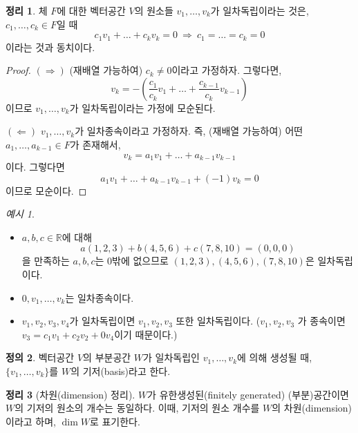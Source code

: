 \documentclass[unfonts,oneside,a4paper]{oblivoir}
\theoremstyle{definition}
\newtheorem{definition}{정의}[section]
\theoremstyle{theorem}
\newtheorem{theorem}[definition]{정리}
\theoremstyle{theorem}
\theoremstyle{remark}
\theoremstyle{remark}
\theoremstyle{remark}
\newtheorem*{example}{예시}
\theoremstyle{remark}
\renewcommand{\vec}[1]{\bm{\mathit{#1}}}
\newcommand{\vecz}{\bm{\mathrm{0}}}
\begin{document}
\begin{theorem}
    체 $F$에 대한 벡터공간 $V$의 원소들 $\vec v_1, \dots, \vec v_k$가 일차독립이라는 것은, $c_1, \dots, c_k \in F$일 때
    \[
        c_1 \vec v_1 + \dots + c_k \vec v_k = \vecz\ \Rightarrow\ c_1 = \dots = c_k = 0
    \]
    이라는 것과 동치이다.
\end{theorem}

\begin{proof}
    $(\Rightarrow)$ (재배열 가능하여) $c_k \neq 0$이라고 가정하자.
    그렇다면,
    \[
        \vec v_k = - \left(\frac{c_1}{c_k} \vec v_1 + \dots + \frac{c_{k - 1}}{c_k} \vec v_{k - 1}\right)
    \]
    이므로 $\vec v_1, \dots, \vec v_k$가 일차독립이라는 가정에 모순된다.

    $(\Leftarrow)$ $\vec v_1, \dots, \vec v_k$가 일차종속이라고 가정하자.
    즉, (재배열 가능하여) 어떤 $a_1, \dots, a_{k - 1} \in F$가 존재해서,
    \[
        \vec v_k = a_1 \vec v_1 + \dots + a_{k - 1} \vec v_{k - 1}
    \]
    이다.
    그렇다면
    \[
        a_1 \vec v_1 + \dots + a_{k - 1} \vec v_{k - 1} + (-1) \vec v_k = \vecz
    \]
    이므로 모순이다.
\end{proof}

\begin{example}
    \leavevmode
    \begin{itemize}
        \item $a, b, c \in \mathbb R$에 대해
            \[
                a(1, 2, 3) + b(4, 5, 6) + c(7, 8, 10) = (0, 0, 0)
            \]
            을 만족하는 $a, b, c$는 0밖에 없으므로 $(1, 2, 3), (4, 5, 6), (7, 8, 10)$은 일차독립이다.
        \item $\vecz, \vec v_1, \dots, \vec v_k$는 일차종속이다.
        \item $\vec v_1, \vec v_2, \vec v_3, \vec v_4$가 일차독립이면 $\vec v_1, \vec v_2, \vec v_3$ 또한 일차독립이다.
            ($\vec v_1, \vec v_2, \vec v_3$ 가 종속이면 $\vec v_3 = c_1 \vec v_1 + c_2 \vec v_2 + 0 \vec v_4$이기 때문이다.)
    \end{itemize}
\end{example}

\begin{definition}
    벡터공간 $V$의 부분공간 $W$가 일차독립인 $\vec v_1, \dots, \vec v_k$에 의해 생성될 때, $\{ \vec v_1, \dots, \vec v_k\}$를 $W$의 기저(basis)라고 한다.
\end{definition}

\begin{theorem}[차원(dimension) 정리] \label{thm:dimension}
    $W$가 유한생성된(finitely generated) (부분)공간이면 $W$의 기저의 원소의 개수는 동일하다.
    이때, 기저의 원소 개수를 $W$의 차원(dimension)이라고 하며, $\dim W$로 표기한다.
\end{theorem}
\end{document}
